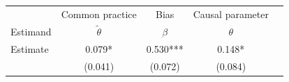 
\begin{tabular}{l|cccc}
\toprule
& Common practice & Bias & Causal parameter \\
Estimand & $\widetilde{\theta}$ & $\beta$ & $\theta$\\
\midrule
Estimate & 0.079* & 0.530*** & 0.148*\\
 & (0.041) & (0.072) & (0.084)\\
\bottomrule
\end{tabular}
